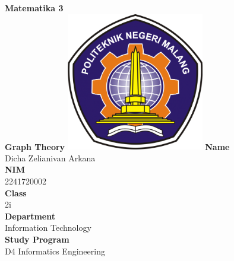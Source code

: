 \documentclass[12pt,titlepage]{article}
\newcommand{\vSubject}{Matematika 3}
\newcommand{\vSubtitle}{Graph Theory}
\newcommand{\vName}{Dicha Zelianivan Arkana}
\newcommand{\vNIM}{2241720002}
\newcommand{\vClass}{2i}
\newcommand{\vDepartment}{Information Technology}
\newcommand{\vStudyProgram}{D4 Informatics Engineering}
\begin{document}
\begin{titlepage}
    \centering
    \vfill
    {\bfseries\LARGE
        \vSubject\\
        \vskip0.25cm
        \vSubtitle
    }
    \vfill
    \includegraphics[width=6cm]{images/polinema-logo.png}
    \vfill
    {
        \textbf{Name}\\
        \vName\\
        \vskip0.5cm
        \textbf{NIM}\\
        \vNIM\\
        \vskip0.5cm
        \textbf{Class}\\
        \vClass\\
        \vskip0.5cm
        \textbf{Department}\\
        \vDepartment\\
        \vskip0.5cm
        \textbf{Study Program}\\
        \vStudyProgram
    }
\end{titlepage}

\tableofcontents

\pagebreak
\end{document}
